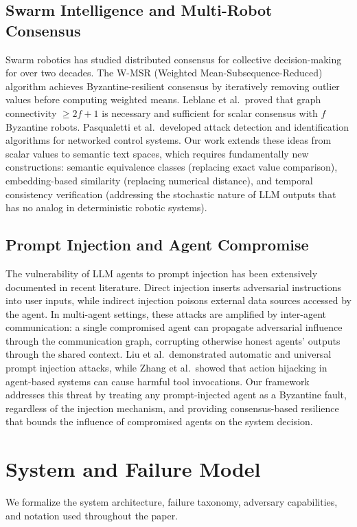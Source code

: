 \documentclass[journal,10pt]{IEEEtran}
\begin{document}
\subsection{Swarm Intelligence and Multi-Robot Consensus}
Swarm robotics has studied distributed consensus for collective decision-making for over two decades. The W-MSR (Weighted Mean-Subsequence-Reduced) algorithm achieves Byzantine-resilient consensus by iteratively removing outlier values before computing weighted means. Leblanc et al.\ proved that graph connectivity $\geq 2f+1$ is necessary and sufficient for scalar consensus with $f$ Byzantine robots. Pasqualetti et al.\ developed attack detection and identification algorithms for networked control systems. Our work extends these ideas from scalar values to semantic text spaces, which requires fundamentally new constructions: semantic equivalence classes (replacing exact value comparison), embedding-based similarity (replacing numerical distance), and temporal consistency verification (addressing the stochastic nature of LLM outputs that has no analog in deterministic robotic systems).

\subsection{Prompt Injection and Agent Compromise}
The vulnerability of LLM agents to prompt injection has been extensively documented in recent literature. Direct injection inserts adversarial instructions into user inputs, while indirect injection poisons external data sources accessed by the agent. In multi-agent settings, these attacks are amplified by inter-agent communication: a single compromised agent can propagate adversarial influence through the communication graph, corrupting otherwise honest agents' outputs through the shared context. Liu et al.\ demonstrated automatic and universal prompt injection attacks, while Zhang et al.\ showed that action hijacking in agent-based systems can cause harmful tool invocations. Our framework addresses this threat by treating any prompt-injected agent as a Byzantine fault, regardless of the injection mechanism, and providing consensus-based resilience that bounds the influence of compromised agents on the system decision.

\section{System and Failure Model}\label{sec:model}
We formalize the system architecture, failure taxonomy, adversary capabilities, and notation used throughout the paper.
\end{document}
